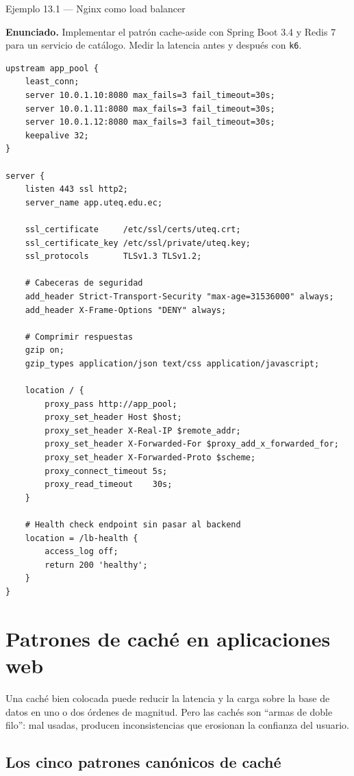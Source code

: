 \documentclass[11pt,a4paper,openany]{book}
\begin{document}
\begin{cajaejemplo}{Ejemplo 13.1 --- Nginx como load balancer}

\textbf{Enunciado.} Implementar el patrón cache-aside con Spring Boot 3.4 y Redis 7 para un servicio de catálogo. Medir la latencia antes y después con \texttt{k6}.

\begin{lstlisting}[style=shell,caption={nginx.conf},label=lst:13.1]
upstream app_pool {
    least_conn;
    server 10.0.1.10:8080 max_fails=3 fail_timeout=30s;
    server 10.0.1.11:8080 max_fails=3 fail_timeout=30s;
    server 10.0.1.12:8080 max_fails=3 fail_timeout=30s;
    keepalive 32;
}

server {
    listen 443 ssl http2;
    server_name app.uteq.edu.ec;

    ssl_certificate     /etc/ssl/certs/uteq.crt;
    ssl_certificate_key /etc/ssl/private/uteq.key;
    ssl_protocols       TLSv1.3 TLSv1.2;

    # Cabeceras de seguridad
    add_header Strict-Transport-Security "max-age=31536000" always;
    add_header X-Frame-Options "DENY" always;

    # Comprimir respuestas
    gzip on;
    gzip_types application/json text/css application/javascript;

    location / {
        proxy_pass http://app_pool;
        proxy_set_header Host $host;
        proxy_set_header X-Real-IP $remote_addr;
        proxy_set_header X-Forwarded-For $proxy_add_x_forwarded_for;
        proxy_set_header X-Forwarded-Proto $scheme;
        proxy_connect_timeout 5s;
        proxy_read_timeout    30s;
    }

    # Health check endpoint sin pasar al backend
    location = /lb-health {
        access_log off;
        return 200 'healthy';
    }
}
\end{lstlisting}
\end{cajaejemplo}

\section{Patrones de caché en aplicaciones web}

Una caché bien colocada puede reducir la latencia y la
carga sobre la base de datos en uno o dos órdenes de magnitud. Pero
las cachés son ``armas de doble filo'': mal usadas, producen
inconsistencias que erosionan la confianza del usuario.


\subsection{Los cinco patrones canónicos de caché}
\end{document}
